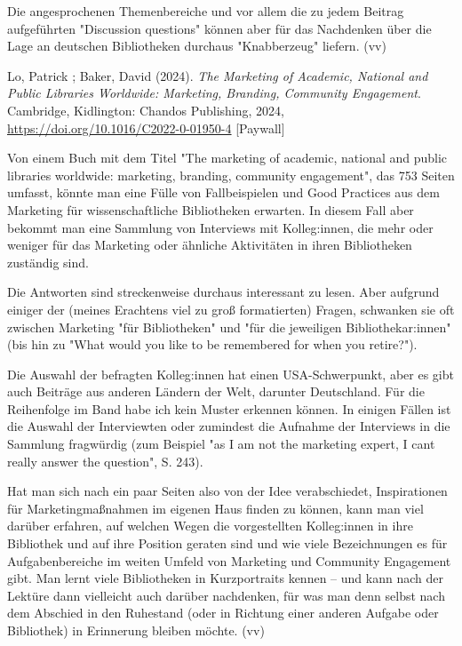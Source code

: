 \documentclass[a4paper,
fontsize=11pt,
oneside,
numbers=noperiodatend,
parskip=half-,
bibliography=totoc,
final
]{scrartcl}
\begin{document}
Die angesprochenen Themenbereiche und vor allem die zu jedem Beitrag
aufgeführten "Discussion questions" können aber für das Nachdenken über
die Lage an deutschen Bibliotheken durchaus "Knabberzeug" liefern. (vv)

Lo, Patrick ; Baker, David (2024). \emph{The Marketing of Academic,
National and Public Libraries Worldwide: Marketing, Branding, Community
Engagement}. Cambridge, Kidlington: Chandos Publishing, 2024,
\url{https://doi.org/10.1016/C2022-0-01950-4} {[}Paywall{]}

Von einem Buch mit dem Titel "The marketing of academic, national and
public libraries worldwide: marketing, branding, community engagement",
das 753 Seiten umfasst, könnte man eine Fülle von Fallbeispielen und
Good Practices aus dem Marketing für wissenschaftliche Bibliotheken
erwarten. In diesem Fall aber bekommt man eine Sammlung von Interviews
mit Kolleg:innen, die mehr oder weniger für das Marketing oder ähnliche
Aktivitäten in ihren Bibliotheken zuständig sind.

Die Antworten sind streckenweise durchaus interessant zu lesen. Aber
aufgrund einiger der (meines Erachtens viel zu groß formatierten)
Fragen, schwanken sie oft zwischen Marketing "für Bibliotheken" und "für
die jeweiligen Bibliothekar:innen" (bis hin zu "What would you like to
be remembered for when you retire?").

Die Auswahl der befragten Kolleg:innen hat einen USA-Schwerpunkt, aber
es gibt auch Beiträge aus anderen Ländern der Welt, darunter
Deutschland. Für die Reihenfolge im Band habe ich kein Muster erkennen
können. In einigen Fällen ist die Auswahl der Interviewten oder
zumindest die Aufnahme der Interviews in die Sammlung fragwürdig (zum
Beispiel "as I am not the marketing expert, I can\textquotesingle t
really answer the question", S. 243).

Hat man sich nach ein paar Seiten also von der Idee verabschiedet,
Inspirationen für Marketingmaßnahmen im eigenen Haus finden zu können,
kann man viel darüber erfahren, auf welchen Wegen die vorgestellten
Kolleg:innen in ihre Bibliothek und auf ihre Position geraten sind und
wie viele Bezeichnungen es für Aufgabenbereiche im weiten Umfeld von
Marketing und Community Engagement gibt. Man lernt viele Bibliotheken in
Kurzportraits kennen -- und kann nach der Lektüre dann vielleicht auch
darüber nachdenken, für was man denn selbst nach dem Abschied in den
Ruhestand (oder in Richtung einer anderen Aufgabe oder Bibliothek) in
Erinnerung bleiben möchte. (vv)
\end{document}
